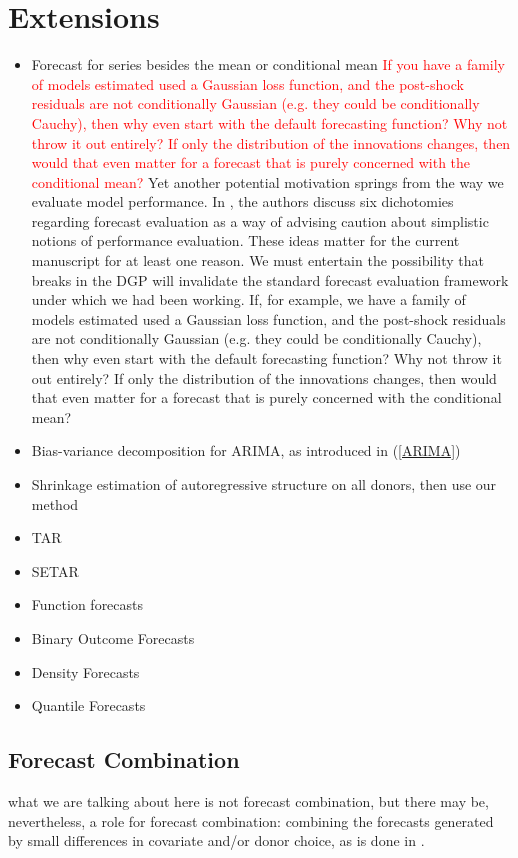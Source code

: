 \documentclass[11pt]{article}
\theoremstyle{definition}
\begin{document}
\section{Extensions}\label{Extensions}

\begin{itemize}
  \item Forecast for series besides the mean or conditional mean \textcolor{red}{If you have a family of models estimated used a Gaussian loss function, and the post-shock residuals are not conditionally Gaussian (e.g. they could be conditionally Cauchy), then why even start with the default forecasting function?  Why not throw it out entirely?  If only the distribution of the innovations changes, then would that even matter for a forecast that is purely concerned with the conditional mean?} Yet another potential motivation springs from the way we evaluate model performance.  In \cite{clements2005evaluating}, the authors discuss six dichotomies regarding forecast evaluation as a way of advising caution about simplistic notions of performance evaluation.  These ideas matter for the current manuscript for at least one reason.  We must entertain the possibility that breaks in the DGP will invalidate the standard forecast evaluation framework under which we had been working.  If, for example, we have a family of models estimated used a Gaussian loss function, and the post-shock residuals are not conditionally Gaussian (e.g. they could be conditionally Cauchy), then why even start with the default forecasting function?  Why not throw it out entirely?  If only the distribution of the innovations changes, then would that even matter for a forecast that is purely concerned with the conditional mean?
  \item Bias-variance decomposition for ARIMA, as introduced in (\ref{ARIMA})
  \item Shrinkage estimation of autoregressive structure on all donors, then use our method
  \item TAR
  \item SETAR
  \item Function forecasts
  \item Binary Outcome Forecasts
  \item Density Forecasts
  \item Quantile Forecasts
\end{itemize}

\subsection{Forecast Combination}
what we are talking about here is not forecast combination, but there may be, nevertheless, a role for forecast combination: combining the forecasts generated by small differences in covariate and/or donor choice, as is done in \cite{lundquist2024volatility}. \\
\end{document}
